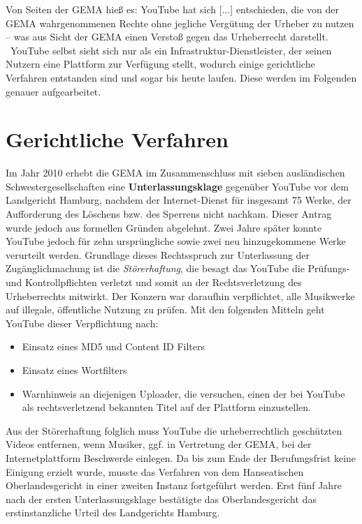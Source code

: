 Von Seiten der GEMA hieß es: \glqq YouTube hat sich [...] entschieden, die von der
GEMA wahrgenommenen Rechte ohne jegliche Vergütung der Urheber zu nutzen – was aus Sicht
der GEMA einen Verstoß gegen das Urheberrecht darstellt.\grqq{} ~YouTube selbst sieht sich nur als ein \glqq Infrastruktur-Dienstleister\grqq, der seinen Nutzern eine Plattform zur Verfügung stellt, wodurch einige gerichtliche Verfahren entstanden sind und sogar bis heute laufen. Diese werden im Folgenden genauer aufgearbeitet.

\section{Gerichtliche Verfahren}		

Im Jahr 2010 erhebt die GEMA im Zusammenschluss mit sieben ausländischen Schwestergesellschaften eine \textbf{Unterlassungsklage} gegenüber YouTube vor dem Landgericht Hamburg, nachdem der Internet-Dienst für insgesamt 75 Werke, der Aufforderung des Löschens bzw. des Sperrens nicht nachkam. Dieser Antrag wurde jedoch aus formellen Gründen abgelehnt. Zwei Jahre später konnte YouTube jedoch für zehn ursprüngliche sowie zwei neu hinzugekommene Werke verurteilt werden. Grundlage dieses Rechtsspruch zur Unterlassung der Zugänglichmachung ist die \textit{Störerhaftung}, die besagt das YouTube die Prüfungs- und Kontrollpflichten verletzt und somit an der Rechtsverletzung des Urheberrechts mitwirkt. Der Konzern war daraufhin verpflichtet, alle Musikwerke auf illegale, öffentliche Nutzung zu prüfen. Mit den folgenden Mitteln geht YouTube dieser Verpflichtung nach:
\begin{itemize}
\item Einsatz eines MD5 und Content ID Filters
\item Einsatz eines Wortfilters
\item Warnhinweis an diejenigen Uploader, die versuchen, einen der bei YouTube als
rechtsverletzend bekannten Titel auf der Plattform einzustellen. 
\end{itemize}
Aus der Störerhaftung folglich muss YouTube die urheberrechtlich geschützten Videos entfernen, wenn Musiker, ggf. in Vertretung der GEMA, bei der Internetplattform Beschwerde einlegen.
Da bis zum Ende der Berufungsfrist keine Einigung erzielt wurde, musste das Verfahren von dem Hanseatischen Oberlandesgericht in einer zweiten Instanz fortgeführt werden. Erst fünf Jahre nach der ersten Unterlassungsklage bestätigte das Oberlandesgericht das erstinstanzliche Urteil des Landgerichts Hamburg.

